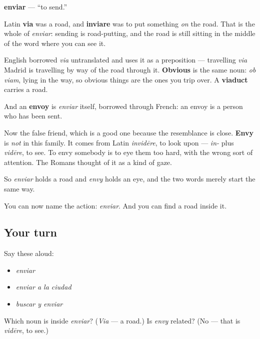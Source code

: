 \begin{cousinweb}
\textbf{enviar} — \textquotedblleft{}to send.\textquotedblright{}

Latin \textbf{via} was a road, and \textbf{inviare} was to put something \emph{on} the road. That is the whole of \emph{enviar}: sending is road-putting, and the road is still sitting in the middle of the word where you can see it.

English borrowed \emph{via} untranslated and uses it as a preposition — travelling \emph{via} Madrid is travelling by way of the road through it. \textbf{Obvious} is the same noun: \emph{ob viam}, lying in the way, so obvious things are the ones you trip over. A \textbf{viaduct} carries a road.

And an \textbf{envoy} is \emph{enviar} itself, borrowed through French: an envoy is a person who has been sent.

Now the false friend, which is a good one because the resemblance is close. \textbf{Envy} is \emph{not} in this family. It comes from Latin \emph{invidēre}, to look upon — \emph{in-} plus \emph{vidēre}, to see. To envy somebody is to eye them too hard, with the wrong sort of attention. The Romans thought of it as a kind of gaze.

So \emph{enviar} holds a road and \emph{envy} holds an eye, and the two words merely start the same way.
\end{cousinweb}

\begin{grammarlens}[title={What you've built}]
You can now name the action: \emph{enviar}. And you can find a road inside it.
\end{grammarlens}

\subsection*{Your turn}
Say these aloud:

\begin{itemize}
\raggedright
  \item \emph{enviar}
  \item \emph{enviar a la ciudad}
  \item \emph{buscar y enviar}
\end{itemize}

\begin{tcolorbox}[breakable,colback=teal!4,colframe=teal!35!black,title={Before you move on}]
Which noun is inside \emph{enviar}? (\emph{Via} — a road.) Is \emph{envy} related? (No — that is \emph{vidēre}, to see.)
\end{tcolorbox}
